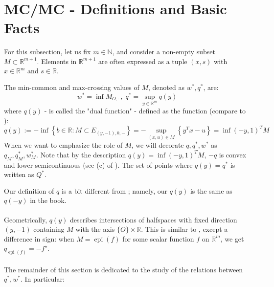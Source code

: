 \section{MC/MC - Definitions and Basic Facts}
\label{sect:031}

\paragraph{}For this subsection, let us fix $m\in \mathbb{N}$, and consider a non-empty subset $M\subset \mathbb{R}^{m+1}$. Elements in $\mathbb{R}^{m+1}$ are often expressed as a tuple $(x,s)$ with $x\in \mathbb{R}^m$ and $s\in \mathbb{R}$.

\begin{defn}[MC/MC]\label{defn:031-mc-mc}
	The min-common and max-crossing values of $M$, denoted as $w^\ast,q^\ast$, are:
	\[
		w^\ast = \inf M_{O,:},\; q^\ast = \sup_{y\in \mathbb{R}^m} q(y)
	\]
	where $q(y)$ - is called the "dual function" - defined as the function (compare to ):
	\[
		q(y):= -\inf\left\{ b\in \mathbb{R}: M\subset E_{(y,-1),b,-} \right\} = - \sup_{(x,u)\in M}\left\{y^Tx-u\right\} = \inf (-y,1)^TM
	\]
	When we want to emphasize the role of $M$, we will decorate $q,q^\ast,w^\ast$ as $q_M,q^\ast_M,w^\ast_M$. Note that by the description $q(y) =\inf (-y,1)^TM$, $-q$ is convex and lower-semicontinuous (see (c) of ). The set of points where $q(y)=q^\ast$ is written as $Q^\ast$.
\end{defn}

\begin{rmrk}
	Our definition of $q$ is a bit different from \cite{bertsekas2009convex}; namely, our $q(y)$ is the same as $q(-y)$ in the book.
\end{rmrk}

\paragraph{}Geometrically, $q(y)$ describes intersections of halfspaces with fixed direction $(y,-1)$ containing $M$ with the axis $\{O\}\times \mathbb{R}$. This is similar to , except a difference in sign: when $M=\operatorname{epi}(f)$ for some scalar function $f$ on $\mathbb{R}^m$, we get $q_{\operatorname{epi}(f)}=-f^\star$.

\paragraph{}The remainder of this section is dedicated to the study of the relations between $q^\ast,w^\ast$. In particular:


